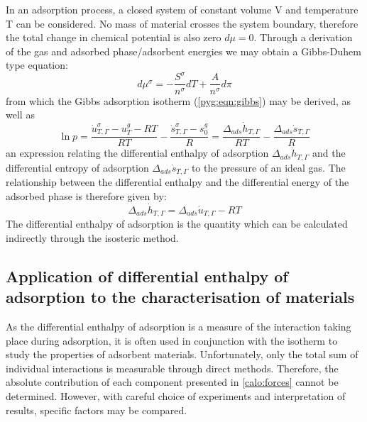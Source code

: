 In an adsorption process, a closed system of constant volume
V and temperature T can be considered. 
No mass of material crosses the system boundary,
therefore the total change in chemical potential is also
zero \(d\mu = 0\). Through
a derivation~\cite{rouquerolAdsorptionPowdersPorous2013} of the
gas and adsorbed phase/adsorbent energies we may obtain a
Gibbs-Duhem type equation:
%
\begin{equation}
	d \mu^{\sigma} = - \frac{S^{\sigma}}{n^{\sigma}} dT + \frac{A}{n^{\sigma}} d \pi
\end{equation}
%
from which the Gibbs adsorption isotherm (\autoref{pyg:eqn:gibbs}) may
be derived, as well as
%
\begin{equation}\label{calo:eqn:enthalpy}
	\ln p = \frac{\dot{u}_{T, \Gamma}^{\sigma} - u_T^g - RT}{RT} %
	- \frac{\dot{s}_{T, \Gamma}^{\sigma} - s^{g}_{0}}{R} %
	= \frac{\Delta_{ads} \dot{h}_{T, \Gamma}}{RT} - \frac{\Delta_{ads} \dot{s}_{T, \Gamma}}{R}
\end{equation}
%
an expression relating the differential enthalpy of adsorption
\(\Delta_{ads} \dot{h}_{T, \Gamma}\) and
the differential entropy of adsorption \(\Delta_{ads} \dot{s}_{T, \Gamma}\)
to the pressure of an ideal gas.
The relationship between the differential enthalpy and the differential energy
of the adsorbed phase is therefore given by:
%
\begin{equation}\label{calo:eqn:adj}
	\Delta_{ads} \dot{h}_{T, \Gamma} = \Delta_{ads} \dot{u}_{T, \Gamma} - RT
\end{equation}
%
The differential enthalpy of adsorption is the quantity which
can be calculated indirectly through the isosteric method.

\subsection{Application of differential enthalpy of adsorption to the characterisation of materials}

As the differential enthalpy of adsorption is a measure
of the interaction taking place during adsorption, it is often
used in conjunction with the isotherm to study the properties
of adsorbent materials.
Unfortunately, only the total sum of individual interactions
is measurable through direct methods. Therefore, the
absolute contribution of each component presented in
\autoref{calo:forces} cannot be determined.
However, with careful choice of experiments and interpretation
of results, specific factors may be compared.

